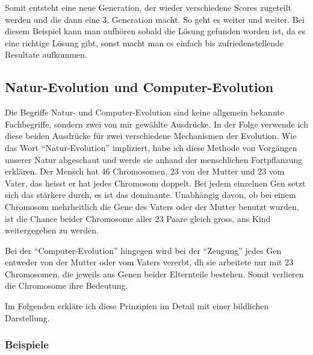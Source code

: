 \documentclass[10pt,a4paper,ngerman,english]{article}
\begin{document}

Somit entsteht eine neue Generation, der wieder verschiedene Scores zugeteilt werden und die dann eine 3. Generation macht. So geht es weiter und weiter. Bei diesem Beispiel kann man aufhören sobald die Lösung gefunden worden ist, da es eine richtige Lösung gibt, sonst macht man es einfach bis zufriedenstellende Resultate aufkommen.

\subsection{Natur-Evolution und Computer-Evolution}
Die Begriffe Natur- und Computer-Evolution sind keine allgemein bekannte Fachbegriffe, sondern zwei von mir gewählte Ausdrücke. In der Folge verwende ich diese beiden Ausdrücke für zwei verschiedene Mechanismen der Evolution. Wie das Wort \enquote{Natur-Evolution} impliziert, habe ich diese Methode von Vorgängen unserer Natur abgeschaut und werde sie anhand der menschlichen Fortpflanzung erklären. Der Mensch hat 46 Chromosomen, 23 von der Mutter und 23 vom Vater, das heisst er hat jedes Chromosom doppelt. Bei jedem einzelnen Gen setzt sich das stärkere durch, es ist das dominante. Unabhängig davon, ob bei einem Chromosom mehrheitlich die Gene des Vaters oder der Mutter benutzt wurden, ist die Chance beider Chromosome aller 23 Paare gleich gross, ans Kind weitergegeben zu werden. 

Bei der \enquote{Computer-Evolution} hingegen wird bei der \enquote{Zeugung} jedes Gen entweder von der Mutter oder vom Vaters vererbt, dh sie arbeitete nur mit 23 Chromosomen, die jeweils aus Genen beider Elternteile bestehen. Somit verlieren die Chromosome ihre Bedeutung. 


Im Folgenden erkläre ich diese Prinzipien im Detail mit einer bildlichen Darstellung.

\subsubsection{Beispiele}
\end{document}
